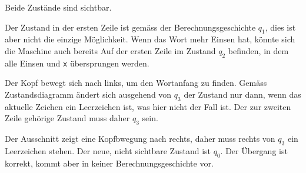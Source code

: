 \begin{loesung}
\begin{teilaufgaben}
Beide Zustände sind sichtbar.
\item
Der Zustand in der ersten Zeile ist gemäss der Berechnungsgeschichte
$q_1$, dies ist aber nicht die einzige Möglichkeit.
Wenn das Wort mehr Einsen hat, könnte sich die Maschine auch bereits
Auf der ersten Zeile im Zustand $q_2$ befinden, in dem alle Einsen
und \texttt{x} übersprungen werden.
\item
Der Kopf bewegt sich nach links, um den Wortanfang zu finden.
Gemäss Zustandsdiagramm ändert sich ausgehend von $q_3$ der Zustand
nur dann, wenn das aktuelle Zeichen ein Leerzeichen ist, was hier
nicht der Fall ist.
Der zur zweiten Zeile gehörige Zustand muss daher $q_3$ sein.
\item
Der Ausschnitt zeigt eine Kopfbwegung nach rechts, daher muss
rechts von $q_3$ ein Leerzeichen stehen.
Der neue, nicht sichtbare Zustand ist $q_0$.
Der Übergang ist korrekt, kommt aber in keiner Berechnungsgeschichte
vor.
\qedhere
\end{teilaufgaben}
\end{loesung}
